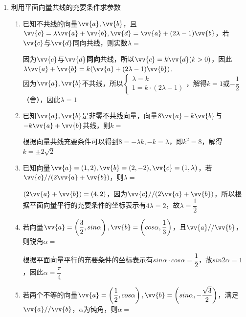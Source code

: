 \begin{enumerate}
    \item 利用平面向量共线的充要条件求参数
    \begin{enumerate}
        \item 已知不共线的向量$\vv{a}, \vv{b}$，且$\vv{c} = \lambda \vv{a} + \vv{b}, \vv{d} = \vv{a} + (2\lambda-1)\vv{b}$，若$\vv{c}$与$\vv{d}$同向共线，则实数$\lambda = $
        \begin{jieda}
            因为$\vv{c}$与$\vv{d}$\textbf{同向}共线，所以$\vv{c}  = k \vv{d} (k > 0)$，因此$\lambda \vv{a} + \vv{b} = k(\vv{a} + (2\lambda-1)\vv{b})$. \\
            因为$\vv{a}, \vv{b}$不共线，所以$\left \{ \begin{array}{l}
                 \lambda = k \\
                 1 = k \cdot (2\lambda - 1) 
            \end{array}\right.$，解得$k = 1$或$-\dfrac{1}{2}$（舍），因此$\lambda = 1$
        \end{jieda}
        \item 已知$\vv{a}, \vv{b}$是非零不共线向量，向量$8\vv{a} - k \vv{b}$与$-k\vv{a} + \vv{b}$共线，则$k = $ 
        \begin{jieda}
            根据向量共线充要条件可以得到$8 = -\lambda k, -k = \lambda$，即$k^2 = 8$，解得$k = \pm 2\sqrt{2}$
        \end{jieda}
        \item 已知向量$\vv{a} = (1, 2), \vv{b} = (2, -2), \vv{c} = (1, \lambda)$，若$\vv{c} // (2\vv{a} + \vv{b})$，则$\lambda = $
        \begin{jieda}
            $(2\vv{a} + \vv{b}) = (4, 2)$，因为$\vv{c} // (2\vv{a} + \vv{b})$，所以根据平面向量平行的充要条件的坐标表示有$4\lambda = 2$，故$\lambda = \dfrac{1}{2}$
        \end{jieda}
        \item 若向量$\vv{a} = \left(\dfrac{3}{2}, sin\alpha\right), \vv{b} = \left(cos\alpha, \dfrac{1}{3}\right)$，且$\vv{a} // \vv{b}$，则锐角$\alpha = $
        \begin{jieda}
            根据平面向量平行的充要条件的坐标表示有$sin\alpha \cdot cos\alpha = \dfrac{1}{2}$，故$sin2\alpha = 1$，因此$\alpha = \dfrac{\pi}{4}$
        \end{jieda}
        \item 若两个不等的向量$\vv{a} = \left(\dfrac{1}{2}, cos\alpha\right), \vv{b} = \left(sin\alpha, -\dfrac{\sqrt{3}}{2}\right)$，满足$\vv{a} // \vv{b}$，$\alpha$为钝角，则$\alpha = $

\end{enumerate}
\end{enumerate}
